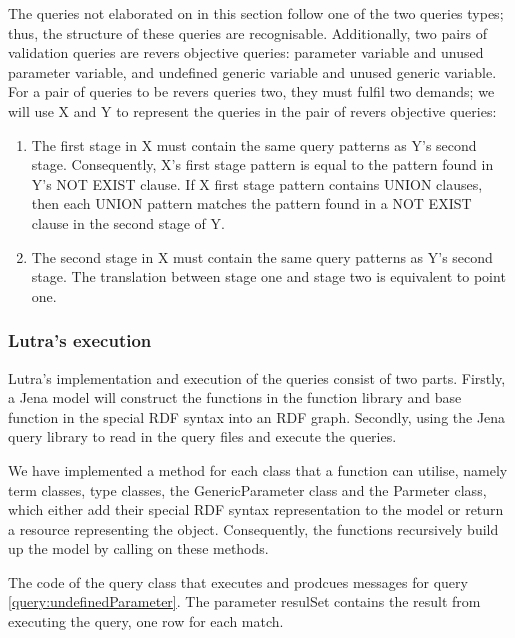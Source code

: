 \para 
The queries not elaborated on in this section follow one of the two queries types; thus, the structure of these queries are recognisable. Additionally, two pairs of validation queries are revers objective queries: parameter variable and unused parameter variable, and undefined generic variable and unused generic variable. For a pair of queries to be revers queries two, they must fulfil two demands; we will use X and Y to represent the queries in the pair of revers objective queries: 
\begin{enumerate}
  \item The first stage in X must contain the same query patterns as Y's second stage. Consequently, X's first stage pattern is equal to the pattern found in Y's NOT EXIST clause. If X first stage pattern contains UNION clauses, then each UNION pattern matches the pattern found in a NOT EXIST clause in the second stage of Y.
  \item The second stage in X must contain the same query patterns as Y's second stage. The translation between stage one and stage two is equivalent to point one. 
\end{enumerate}

\subsubsection{Lutra's execution}
Lutra's implementation and execution of the queries consist of two parts. Firstly, a Jena model will construct the functions in the function library and base function in the special RDF syntax into an RDF graph. Secondly, using the Jena query library to read in the query files and execute the queries.  

\para
We have implemented a method for each class that a function can utilise, namely term classes, type classes, the GenericParameter class and the Parmeter class, which either add their special RDF syntax representation to the model or return a resource representing the object. Consequently, the functions recursively build up the model by calling on these methods. 

\begin{code}
  \label{queryClassExample}
  The code of the query class that executes and prodcues messages for query \ref{query:undefinedParameter}. The parameter resulSet contains the result from executing the query, one row for each match.
\end{code}


